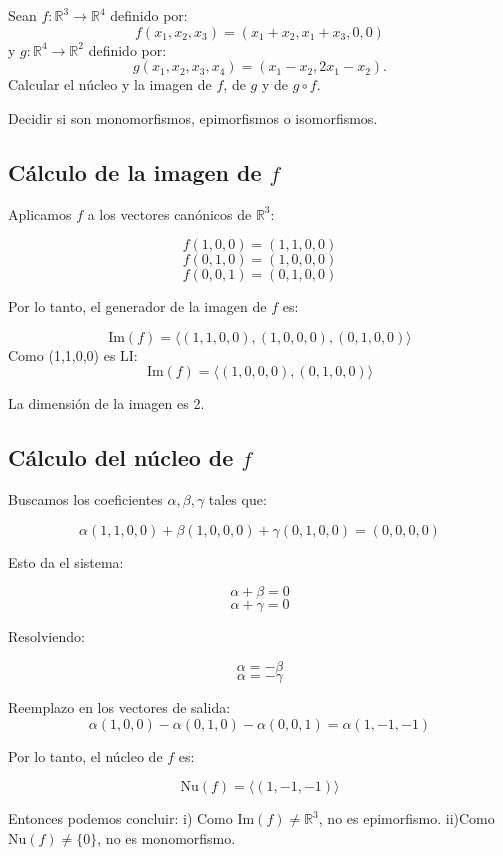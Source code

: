 \begin{enunciado}{\ejercicio}
    Sean \( f: \mathbb{R}^3 \to \mathbb{R}^4 \) definido por:
    \[
    f(x_1, x_2, x_3) = (x_1 + x_2, x_1 + x_3, 0, 0)
    \]
    y \( g: \mathbb{R}^4 \to \mathbb{R}^2 \) definido por:
    \[
    g(x_1, x_2, x_3, x_4) = (x_1 - x_2, 2x_1 - x_2).
    \]
    Calcular el núcleo y la imagen de \( f \), de \( g \) y de \( g \circ f \).  
    
    Decidir si son monomorfismos, epimorfismos o isomorfismos.
\end{enunciado}

\subsection*{Cálculo de la imagen de \( f \)}

Aplicamos \( f \) a los vectores canónicos de \( \mathbb{R}^3 \):

\[ f(1,0,0) = (1,1,0,0) \]
\[ f(0,1,0) = (1,0,0,0) \]
\[ f(0,0,1) = (0,1,0,0) \]

Por lo tanto, el generador de la imagen de \( f \) es:

\[ \text{Im}(f) = \langle (1,1,0,0), (1,0,0,0), (0,1,0,0) \rangle \]
Como (1,1,0,0) es LI:
\[ \text{Im}(f) = \langle  (1,0,0,0), (0,1,0,0) \rangle \]


La dimensión de la imagen es 2.

\subsection*{Cálculo del núcleo de \( f \)}

Buscamos los coeficientes \( \alpha, \beta, \gamma \) tales que:

\[ \alpha(1,1,0,0) + \beta(1,0,0,0) + \gamma(0,1,0,0) = (0,0,0,0) \]

Esto da el sistema:

\[ \alpha + \beta = 0 \]
\[ \alpha + \gamma = 0 \]

Resolviendo:

\[ \alpha = -\beta \]
\[ \alpha = -\gamma \]

Reemplazo en los vectores de salida:
\[ \alpha(1,0,0) - \alpha(0,1,0) - \alpha(0,0,1) = \alpha(1,-1,-1) \]


Por lo tanto, el núcleo de \( f \) es:

\[ \text{Nu}(f) = \langle (1,-1,-1) \rangle \]


Entonces podemos concluir:
\newline
i) Como \( \text{Im}(f) \neq \mathbb{R}^3 \), no es epimorfismo.
\newline
ii)Como \( \text{Nu}(f) \neq \{0\} \), no es monomorfismo.


\begin{aportes}
    \item {}
\end{aportes}